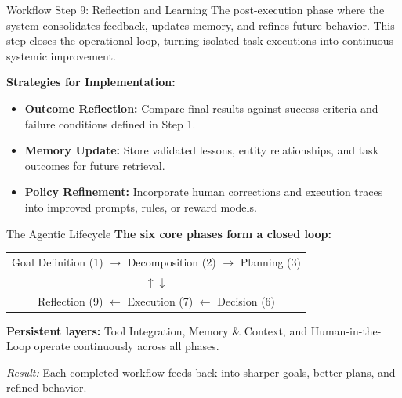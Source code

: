 \documentclass[
11pt,notheorems,hyperref={pdfauthor=whatever}
]{beamer}
\begin{document}
\begin{frame}{Workflow Step 9: Reflection and Learning}
	The post-execution phase where the system consolidates feedback, updates memory, and refines future behavior. This step closes the operational loop, turning isolated task executions into continuous systemic improvement.
	
	\vspace{0.3cm}
	
	\textbf{Strategies for Implementation:}
	\begin{itemize}
		\item \textbf{Outcome Reflection:} Compare final results against success criteria and failure conditions defined in Step 1.
		\item \textbf{Memory Update:} Store validated lessons, entity relationships, and task outcomes for future retrieval.
		\item \textbf{Policy Refinement:} Incorporate human corrections and execution traces into improved prompts, rules, or reward models.
	\end{itemize}
	

\end{frame}

\begin{frame}{The Agentic Lifecycle}
	\textbf{The six core phases form a closed loop:}
	
	\vspace{0.3cm}
	
	\begin{center}
		\large
		\begin{tabular}{c}
			Goal Definition (1) $\rightarrow$ Decomposition (2) $\rightarrow$ Planning (3) \\[0.2cm]
			$\uparrow$\hspace{4.5cm}$\downarrow$ \\[0.2cm]
			Reflection (9) $\leftarrow$ Execution (7) $\leftarrow$ Decision (6)
		\end{tabular}
	\end{center}
	
	\vspace{0.3cm}
	
	\textbf{Persistent layers:} Tool Integration, Memory \& Context, and Human-in-the-Loop operate continuously across all phases.
	
	\vspace{0.3cm}
	
	\textit{Result:} Each completed workflow feeds back into sharper goals, better plans, and refined behavior.
\end{frame}
\end{document}
